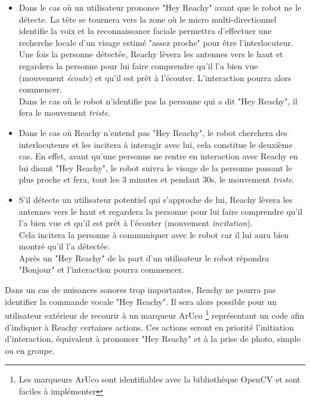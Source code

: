 \begin{itemize}[leftmargin=*]
\item Dans le cas où un utilisateur prononce "Hey Reachy" avant que le robot ne le détecte. La tête se tournera vers la zone où le micro multi-directionnel identifie la voix et la reconnaissance faciale permettra d'effectuer une recherche locale d'un visage estimé "assez proche" pour être l'interlocuteur. \\
Une fois la personne détectée, Reachy lèvera les antennes vers le haut et regardera la personne pour lui faire comprendre qu'il l'a bien vue (mouvement \textit{écoute}) et qu'il est prêt à l'écouter. L'interaction pourra alors commencer. \\
Dans le cas où le robot n'identifie pas la personne qui a dit "Hey Reachy", il fera le mouvement \textit{triste}. \\

\item Dans le cas où Reachy n'entend pas "Hey Reachy", le robot cherchera des interlocuteurs et les incitera à interagir avec lui, cela constitue le deuxième cas. En effet, avant qu'une personne ne rentre en interaction avec Reachy en lui disant "Hey Reachy", le robot suivra le visage de la personne passant le plus proche et fera, tout les 3 minutes et pendant 30s, le mouvement \textit{triste}. \\

\item[] S'il détecte un utilisateur potentiel qui s'approche de lui, Reachy lèvera les antennes vers le haut et regardera la personne pour lui faire comprendre qu'il l'a bien vue et qu'il est prêt à l'écouter (mouvement \textit{incitation}). \\
Cela incitera la personne à communiquer avec le robot car il lui aura bien montré qu'il l'a détectée.\\
Après un "Hey Reachy" de la part d'un utilisateur le robot répondra "Bonjour" et l'interaction pourra commencer. \\
\end{itemize}

Dans un cas de nuisances sonores trop importantes, Reachy ne pourra pas identifier la commande vocale "Hey Reachy". Il sera alors possible pour un utilisateur extérieur de recourir à un marqueur ArUco \footnote{Les marqueurs ArUco sont identifiables avec la bibliothèque OpenCV et sont faciles à implémenter} représentant un code afin d'indiquer à Reachy certaines actions. Ces actions seront en priorité l'initiation d'interaction, équivalent à prononcer "Hey Reachy" et à la prise de photo, simple ou en groupe. \\


